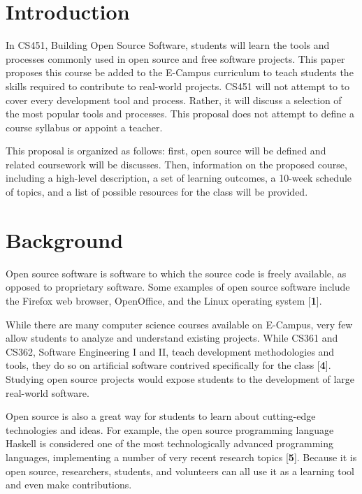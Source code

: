 \documentclass[12pt,letterpaper]{article}
\newcommand{\mkref}[1]{[\textbf{#1}]}
\begin{document}
\pagebreak

\tableofcontents

\cleardoublepage
{}
\listoftables

\pagebreak

\section{Introduction}
In CS451, Building Open Source Software, students will learn the tools and
processes commonly used in open source and free software projects.  This paper
proposes this course be added to the E-Campus curriculum to teach students the
skills required to contribute to real-world projects.  CS451 will not attempt to
to cover every development tool and process.  Rather, it will discuss a
selection of the most popular tools and processes.  This proposal does not
attempt to define a course syllabus or appoint a teacher.

This proposal is organized as follows: first, open source will be defined and
related coursework will be discusses.  Then, information on the proposed course,
including a high-level description, a set of learning outcomes, a 10-week
schedule of topics, and a list of possible resources for the class will be
provided.

\section{Background}
Open source software is software to which the source code is freely available,
as opposed to proprietary software.  Some examples of open source software
include the Firefox web browser, OpenOffice, and the Linux operating system
\mkref{1}.

While there are many computer science courses available on E-Campus, very few
allow students to analyze and understand existing projects.  While CS361 and
CS362, Software Engineering I and II, teach development methodologies and tools,
they do so on artificial software contrived specifically for the class
\mkref{4}.  Studying open source projects would expose students to the
development of large real-world software.

Open source is also a great way for students to learn about cutting-edge
technologies and ideas.  For example, the open source programming language
Haskell is considered one of the most technologically advanced programming
languages, implementing a number of very recent research topics \mkref{5}.
Because it is open source, researchers, students, and volunteers can all use it
as a learning tool and even make contributions.
\end{document}
